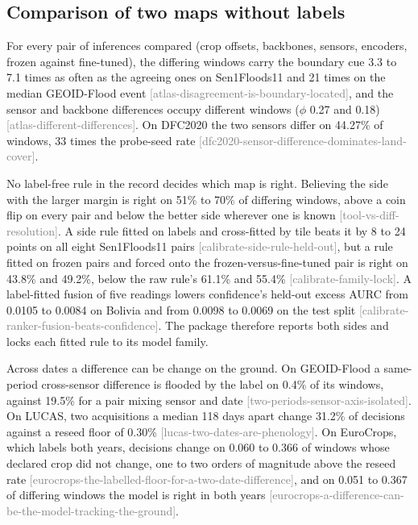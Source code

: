 \documentclass[11pt,a4paper]{article}
\newcommand{\claim}[1]{{\scriptsize\textsf{\textcolor{gray}{[#1]}}}}
\begin{document}
\subsection{Comparison of two maps without labels}
\label{sec:res-compare}

For every pair of inferences compared (crop offsets, backbones, sensors, encoders, frozen against fine-tuned), the
differing windows carry the boundary cue 3.3 to 7.1 times as often as the agreeing ones on Sen1Floods11 and 21 times on
the median GEOID-Flood event \claim{atlas-disagreement-is-boundary-located}, and the sensor and backbone differences
occupy different windows ($\phi$ 0.27 and 0.18) \claim{atlas-different-differences}. On DFC2020 the two sensors differ on
44.27\% of windows, 33 times the probe-seed rate \claim{dfc2020-sensor-difference-dominates-land-cover}.

No label-free rule in the record decides which map is right. Believing the side with the larger margin is right on 51\%
to 70\% of differing windows, above a coin flip on every pair and below the better side wherever one is known
\claim{tool-vs-diff-resolution}. A side rule fitted on labels and cross-fitted by tile beats it by 8 to 24 points on all eight Sen1Floods11 pairs
\claim{calibrate-side-rule-held-out}, but a rule fitted on frozen pairs and forced onto the frozen-versus-fine-tuned pair
is right on 43.8\% and 49.2\%, below the raw rule's 61.1\% and 55.4\% \claim{calibrate-family-lock}. A label-fitted fusion of five readings lowers
confidence's held-out excess AURC from 0.0105 to 0.0084 on Bolivia and from 0.0098 to 0.0069 on the test split
\claim{calibrate-ranker-fusion-beats-confidence}. The package therefore reports both sides and locks each fitted rule to
its model family.

Across dates a difference can be change on the ground. On GEOID-Flood a same-period cross-sensor difference is flooded by
the label on 0.4\% of its windows, against 19.5\% for a pair mixing sensor and date \claim{two-periods-sensor-axis-isolated}.
On LUCAS, two acquisitions a median 118 days apart change 31.2\% of decisions against a reseed floor of 0.30\%
\claim{lucas-two-dates-are-phenology}. On EuroCrops, which labels both years, decisions change on 0.060 to 0.366 of
windows whose declared crop did not change, one to two orders of magnitude above the reseed rate
\claim{eurocrops-the-labelled-floor-for-a-two-date-difference}, and on 0.051 to 0.367 of differing windows the model is
right in both years \claim{eurocrops-a-difference-can-be-the-model-tracking-the-ground}.
\end{document}
